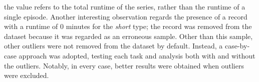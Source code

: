 the value refers to the total runtime of the series, rather than the runtime of a single episode.
Another interesting observation regards the presence of a record with a runtime of 0 minutes for the \textit{short} type;
the record was removed from the dataset because it was regarded as an erroneous sample.
Other than this sample, other outliers were not removed from the dataset by default. Instead, a case-by-case approach was adopted,
testing each task and analysis both with and without the outliers. Notably, in every case, better results were obtained when outliers were excluded.